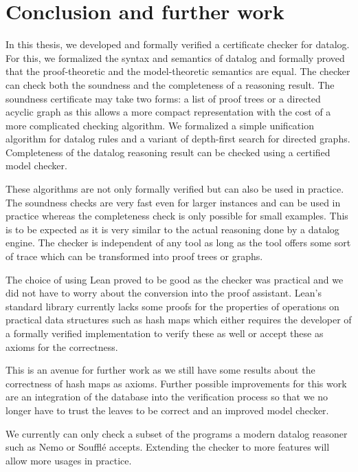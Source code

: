 \section{Conclusion and further work}

In this thesis, we developed and formally verified a certificate checker for datalog. For this, we formalized the syntax and semantics of datalog and formally proved that the proof-theoretic and the model-theoretic semantics are equal. The checker can check both the soundness and the completeness of a reasoning result. The soundness certificate may take two forms: a list of proof trees or a directed acyclic graph as this allows a more compact representation with the cost of a more complicated checking algorithm. We formalized a simple unification algorithm for datalog rules and a variant of depth-first search for directed graphs. Completeness of the datalog reasoning result can be checked using a certified model checker. 

These algorithms are not only formally verified but can also be used in practice. The soundness checks are very fast even for larger instances and can be used in practice whereas the completeness check is only possible for small examples. This is to be expected as it is very similar to the actual reasoning done by a datalog engine. The checker is independent of any tool as long as the tool offers some sort of trace which can be transformed into proof trees or graphs.

The choice of using Lean proved to be good as the checker was practical and we did not have to worry about the conversion into the proof assistant. Lean's standard library currently lacks some proofs for the properties of operations on practical data structures such as hash maps which either requires the developer of a formally verified implementation to verify these as well or accept these as axioms for the correctness.

This is an avenue for further work as we still have some results about the correctness of hash maps as axioms. Further possible improvements for this work are an integration of the database into the verification process so that we no longer have to trust the leaves to be correct and an improved model checker.

We currently can only check a subset of the programs a modern datalog reasoner such as Nemo or Soufflé accepts. Extending the checker to more features will allow more usages in practice. 

